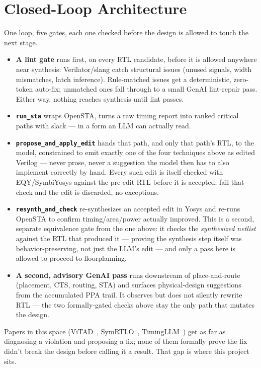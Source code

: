\documentclass[11pt]{article}
\begin{document}
\section*{Closed-Loop Architecture}

One loop, five gates, each one checked before the design is allowed to touch
the next stage.

\begin{itemize}[leftmargin=1.4em, itemsep=3pt]
\item \textbf{A lint gate} runs first, on every RTL candidate, before it is
allowed anywhere near synthesis: Verilator/slang catch structural issues
(unused signals, width mismatches, latch inference). Rule-matched issues get
a deterministic, zero-token auto-fix; unmatched ones fall through to a small
GenAI lint-repair pass. Either way, nothing reaches synthesis until lint
passes.
\item \textbf{\texttt{run\_sta}} wraps OpenSTA, turns a raw timing report into
ranked critical paths with slack --- in a form an LLM can actually read.
\item \textbf{\texttt{propose\_and\_apply\_edit}} hands that path, and only
that path's RTL, to the model, constrained to emit exactly one of the four
techniques above as edited Verilog --- never prose, never a suggestion the
model then has to also implement correctly by hand. Every such edit is itself
checked with EQY/SymbiYosys against the pre-edit RTL before it is accepted;
fail that check and the edit is discarded, no exceptions.
\item \textbf{\texttt{resynth\_and\_check}} re-synthesizes an accepted edit in
Yosys and re-runs OpenSTA to confirm timing/area/power actually improved.
This is a second, separate equivalence gate from the one above: it checks the
\emph{synthesized netlist} against the RTL that produced it --- proving the
synthesis step itself was behavior-preserving, not just the LLM's edit --- and
only a pass here is allowed to proceed to floorplanning.
\item \textbf{A second, advisory GenAI pass} runs downstream of
place-and-route (placement, CTS, routing, STA) and surfaces physical-design
suggestions from the accumulated PPA trail. It observes but does not silently
rewrite RTL --- the two formally-gated checks above stay the only path that
mutates the design.
\end{itemize}

Papers in this space (ViTAD~\cite{vitad}, SymRTLO~\cite{symrtlo},
TimingLLM~\cite{timingllm}) get as far as diagnosing a violation and
proposing a fix; none of them formally prove the fix didn't break the design
before calling it a result. That gap is where this project sits.
\end{document}
